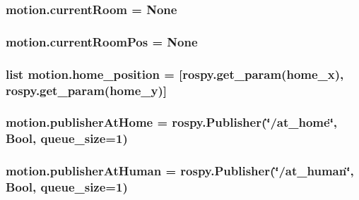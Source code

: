 \subsubsection[{\texorpdfstring{current\+Room}{currentRoom}}]{\setlength{\rightskip}{0pt plus 5cm}motion.\+current\+Room = None}\hypertarget{namespacemotion_ac7315ec450891f4f81a17315dccc7903}{}\label{namespacemotion_ac7315ec450891f4f81a17315dccc7903}
\subsubsection[{\texorpdfstring{current\+Room\+Pos}{currentRoomPos}}]{\setlength{\rightskip}{0pt plus 5cm}motion.\+current\+Room\+Pos = None}\hypertarget{namespacemotion_a635c1fd35291e93dc73ab2f6c6f7c8c4}{}\label{namespacemotion_a635c1fd35291e93dc73ab2f6c6f7c8c4}
\subsubsection[{\texorpdfstring{home\+\_\+position}{home_position}}]{\setlength{\rightskip}{0pt plus 5cm}list motion.\+home\+\_\+position = \mbox{[}rospy.\+get\+\_\+param(\textquotesingle{}home\+\_\+x\textquotesingle{}), rospy.\+get\+\_\+param(\textquotesingle{}home\+\_\+y\textquotesingle{})\mbox{]}}\hypertarget{namespacemotion_aa995e8257b20bb286a59bf6bb3c5f375}{}\label{namespacemotion_aa995e8257b20bb286a59bf6bb3c5f375}
\subsubsection[{\texorpdfstring{publisher\+At\+Home}{publisherAtHome}}]{\setlength{\rightskip}{0pt plus 5cm}motion.\+publisher\+At\+Home = rospy.\+Publisher(\char`\"{}/at\+\_\+home\char`\"{}, Bool, queue\+\_\+size=1)}\hypertarget{namespacemotion_aa7760f4160a77a04d3cc60233ad138ab}{}\label{namespacemotion_aa7760f4160a77a04d3cc60233ad138ab}
\subsubsection[{\texorpdfstring{publisher\+At\+Human}{publisherAtHuman}}]{\setlength{\rightskip}{0pt plus 5cm}motion.\+publisher\+At\+Human = rospy.\+Publisher(\char`\"{}/at\+\_\+human\char`\"{}, Bool, queue\+\_\+size=1)}\hypertarget{namespacemotion_a11a206a594fcaf6dff8429664bcce376}{}\label{namespacemotion_a11a206a594fcaf6dff8429664bcce376}
